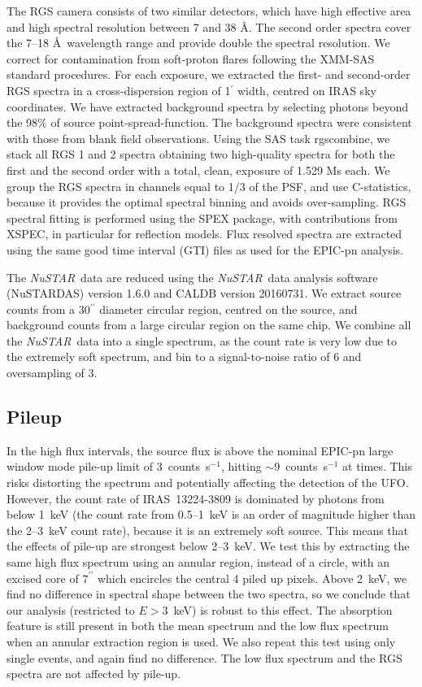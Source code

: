 \documentclass[10pt, a4paper]{article}
\newcommand{\nustar}{\textit{NuSTAR}}
\begin{document}
The RGS camera consists of two similar detectors, which have high effective area and high spectral resolution between 7 and 38 \AA . The second order spectra cover the 7--18 \AA\ wavelength range and provide double the spectral resolution. We correct for contamination from soft-proton flares following the XMM-SAS standard procedures. For each exposure, we extracted the first- and second-order RGS spectra in a cross-dispersion region of 1$^\prime$ width, centred on IRAS sky coordinates. We have extracted background spectra by selecting photons beyond the 98\% of source point-spread-function. The background spectra were consistent with those from blank field observations. Using the SAS task {\sc rgscombine}, we stack all RGS 1 and 2 spectra obtaining two high-quality spectra for both the first and the second order with a total, clean, exposure of 1.529 Ms each. We group the RGS spectra in channels equal to 1/3 of the PSF, and use C-statistics, because it provides the optimal spectral binning and avoids over-sampling. RGS spectral fitting is performed using the SPEX package, with contributions from XSPEC, in particular for reflection models. Flux resolved spectra are extracted using the same good time interval (GTI) files as used for the EPIC-pn analysis.

The \nustar\ data are reduced using the \nustar\ data analysis software (NuSTARDAS) version 1.6.0 and CALDB version 20160731. We extract source counts from a 30$^{\prime\prime}$ diameter circular region, centred on the source, and background counts from a large circular region on the same chip. We combine all the \nustar\ data into a single spectrum, as the count rate is very low due to the extremely soft spectrum, and bin to a signal-to-noise ratio of 6 and oversampling of 3.



\subsection*{Pileup}
In the high flux intervals, the source flux is above the nominal EPIC-pn large window mode pile-up limit of 3~counts~s$^{-1}$\cite{Jethwa15}, hitting $\sim9$~counts~s$^{-1}$ at times. This risks distorting the spectrum and potentially affecting the detection of the UFO. However, the count rate of IRAS~13224-3809 is dominated by photons from below 1~keV (the count rate from 0.5--1~keV is an order of magnitude higher than the 2--3~keV count rate), because it is an extremely soft source. This means that the effects of pile-up are strongest below 2--3~keV. We test this by extracting the same high flux spectrum using an annular region, instead of a circle, with an excised core of $7^{\prime\prime}$ which encircles the central 4 piled up pixels. Above 2~keV, we find no difference in spectral shape between the two spectra, so we conclude that our analysis (restricted to $E>3$~keV) is robust to this effect.
The absorption feature is still present in both the mean spectrum and the low flux spectrum when an annular extraction region is used. We also repeat this test using only single events, and again find no difference. The low flux spectrum and the RGS spectra are not affected by pile-up.
\end{document}
